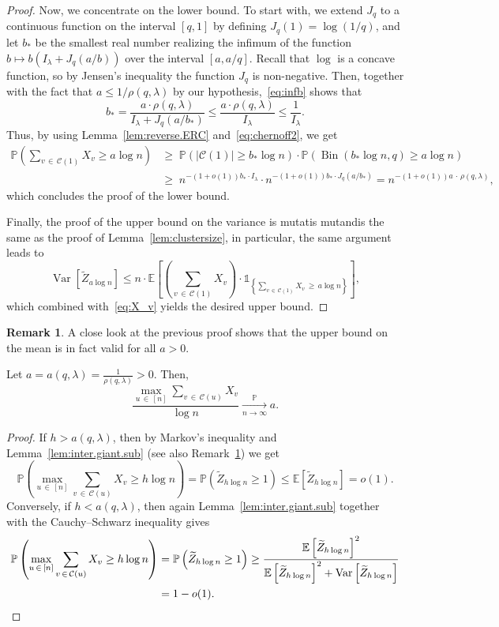 \documentclass[10pt]{amsart}
\theoremstyle{definition}\newtheorem{defi}[theo]{Definition}\newtheorem{rema}[theo]{Remark}\newtheorem{exam}[theo]{Example}\newtheorem{exem}[theo]{Example}\newtheorem{nota}[theo]{Notation}
\renewcommand{\Pr}{\mathbb{P}}
\newcommand{\bbE}{\mathbb{E}}
\newcommand{\cC}{\mathcal{C}}
\DeclareMathOperator{\rVar}{Var}
\DeclareMathOperator{\rBin}{Bin}
\begin{document}
\begin{proof}
Now, we concentrate on the lower bound. To start with, we extend $J_q$ to a conti\-nuous function on the interval $[q,1]$ by defining $J_q(1)= \log(1/q)$, and let $b_*$ be the smallest real number realizing the infimum of the function $b\mapsto b(I_\lambda + J_q(a/b))$ over the interval $[a,a/q]$. Recall that $\log$ is a concave function, so by Jensen's inequality the function $J_q$ is non-negative. Then, together with the fact that $a\le 1/\rho(q,\lambda)$ by our hypothesis,~\eqref{eq:infb} shows that
\[
b_* = \frac{a \cdot \rho(q,\lambda)}{I_{\lambda} + J_q(a/b_*)} \le \frac{a \cdot \rho(q,\lambda)}{I_\lambda} \le \frac{1}{I_\lambda}.
\]
Thus, by using Lemma~\ref{lem:reverse.ERC} and~\eqref{eq:chernoff2}, we get
\begin{align*}
\Pr\left(\sum_{v\,\in\,\cC(1)} X_v\ge a\log n\right) &\ge\;
\Pr(|\cC(1)|\ge b_*\log n) \cdot \Pr(\rBin(b_*\log n,q)\ge a\log n)\\
& \ge \; n^{-(1+o(1))b_*\cdot I_{\lambda}}\cdot n^{-(1+o(1)) b_*\cdot J_q(a/b_*)}= n^{-(1+o(1)) a\,\cdot\, \rho(q,\lambda)},
\end{align*}
which concludes the proof of the lower bound.


Finally, the proof of the upper bound on the variance is mutatis mutandis the same as the proof of Lemma~\ref{lem:clustersize}, in particular, the same argument leads to
\[
\rVar\left[\widetilde Z_{a\log n}\right]\le n\cdot \bbE\left[\left(\sum_{v\,\in\,\cC(1)} X_v\right)\cdot \mathds{1}_{\left\{\sum_{v\,\in\,\cC(1)} X_v \,\ge\, a \log n\right\}} \right],
\]
which combined with~\eqref{eq:X_v} yields the desired upper bound.
\end{proof}

\begin{rema}\label{rem:alla}
A close look at the previous proof shows that the upper bound on the mean is in fact valid for all $a>0$.
\end{rema}

\begin{coro}\label{cor:LLN.inter.giant}
Let $a=a(q,\lambda)= \frac{1}{\rho(q,\lambda)}>0$. Then,
\[
\frac{\max_{u\,\in\,[n]} \sum_{v\,\in\,\cC(u)} X_v}{\log n} \xrightarrow[n\to\infty]{\Pr} a.
\]
\end{coro}
\begin{proof}
If $h>a(q,\lambda)$, then by Markov's inequality and Lemma~\ref{lem:inter.giant.sub} (see also Remark~\ref{rem:alla}) we get
\[
\Pr\left(\max_{u\,\in\,[n]} \sum_{v\,\in\,\cC(u)} X_v \ge h \log n \right) = \Pr\left(\widetilde Z_{h\log n}\ge 1\right) \le\bbE\left[\widetilde Z_{h\log n}\right] = o(1).
\]
Conversely, if $h<a(q,\lambda)$, then again Lemma~\ref{lem:inter.giant.sub} together with the Cauchy--Schwarz inequality gives
\begin{align*}
\Pr\left(\max_{u\,\in\,[n]} \sum_{v\,\in\,\cC(u)} X_v \ge h \log n \right) &= \Pr\left(\widetilde Z_{h\log n}\ge 1\right) \ge
\frac{\bbE\left[\widetilde Z_{h\log n}\right]^2}{\bbE\left[\widetilde Z_{h\log n}\right]^2+\rVar\left[\widetilde Z_{h\log n}\right]}\\
 &= 1-o(1).\qedhere
\end{align*}
\end{proof}
\end{document}
